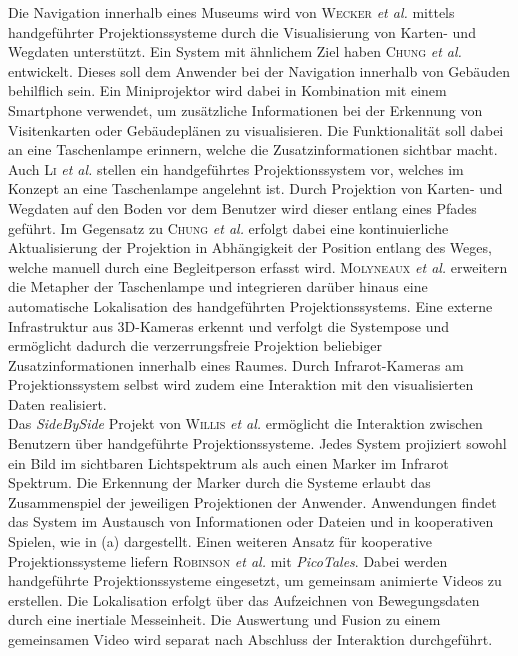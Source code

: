 Die Navigation innerhalb eines Museums wird von \textsc{Wecker} \textit{et al.} \cite{Wecker2013} mittels handgeführter Projektionssysteme durch die Visualisierung von Karten- und Wegdaten unterstützt. Ein System mit ähnlichem Ziel haben \textsc{Chung} \textit{et al.} \cite{Chung2011} entwickelt. Dieses soll dem Anwender bei der Navigation innerhalb von Gebäuden behilflich sein. Ein Miniprojektor wird dabei in Kombination mit einem Smartphone verwendet, um zusätzliche Informationen bei der Erkennung von Visitenkarten oder Gebäudeplänen zu visualisieren. Die Funktionalität soll dabei an eine Taschenlampe erinnern, welche die Zusatzinformationen sichtbar macht. Auch \textsc{Li} \textit{et al.} \cite{Li2013} stellen ein handgeführtes Projektionssystem vor, welches im Konzept an eine Taschenlampe angelehnt ist. Durch Projektion von Karten- und Wegdaten auf den Boden vor dem Benutzer wird dieser entlang eines Pfades geführt. Im Gegensatz zu \textsc{Chung} \textit{et al.} erfolgt dabei eine kontinuierliche Aktualisierung der Projektion in Abhängigkeit der Position entlang des Weges, welche manuell durch eine Begleitperson erfasst wird. \textsc{Molyneaux} \textit{et al.} \cite{Molyneaux2012} erweitern die Metapher der Taschenlampe und integrieren darüber hinaus eine automatische Lokalisation des handgeführten Projektionssystems. Eine externe Infrastruktur aus 3D-Kameras erkennt und verfolgt die Systempose und ermöglicht dadurch die verzerrungsfreie Projektion beliebiger Zusatzinformationen innerhalb eines Raumes. Durch Infrarot-Kameras am Projektionssystem selbst wird zudem eine Interaktion mit den visualisierten Daten realisiert.\\

Das \textit{SideBySide} Projekt von \textsc{Willis} \textit{et al.} \cite{Willis2011} ermöglicht die Interaktion zwischen Benutzern über handgeführte Projektionssysteme. Jedes System projiziert sowohl ein Bild im sichtbaren Lichtspektrum als auch einen Marker im Infrarot Spektrum. Die Erkennung der Marker durch die Systeme erlaubt das Zusammenspiel der jeweiligen Projektionen der Anwender. Anwendungen findet das System im Austausch von Informationen oder Dateien und in kooperativen Spielen, wie in  (a) dargestellt. Einen weiteren Ansatz für kooperative Projektionssysteme liefern \textsc{Robinson} \textit{et al.} \cite{Robinson2012} mit \textit{PicoTales}. Dabei werden handgeführte Projektionssysteme eingesetzt, um gemeinsam animierte Videos zu erstellen. Die Lokalisation erfolgt über das Aufzeichnen von Bewegungsdaten durch eine inertiale Messeinheit. Die Auswertung und Fusion zu einem gemeinsamen Video wird separat nach Abschluss der Interaktion durchgeführt.\\

